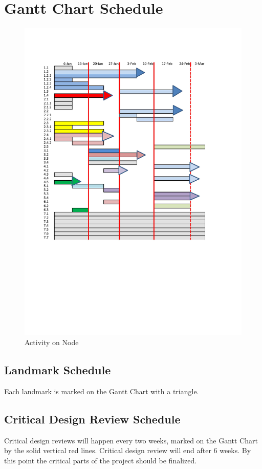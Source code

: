 \section{Gantt Chart Schedule}
\begin{figure}[H]
\centering
\includegraphics[width=1\textwidth]{gantt.jpg}
\caption{Activity on Node}
\label{fig:Activity on Node}
\end{figure}
\subsection{Landmark Schedule}
Each landmark is marked on the Gantt Chart with a triangle.
\subsection{Critical Design Review Schedule}
Critical design reviews will happen every two weeks, marked on the Gantt Chart by the solid vertical red lines.
Critical design review will end after 6 weeks. By this point the critical parts of the project should be finalized. 
